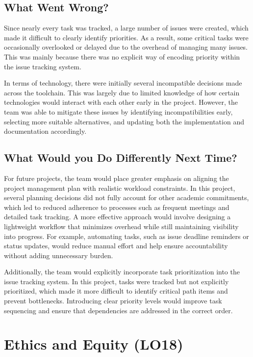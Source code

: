 \documentclass{article}
\begin{document}
\subsection{What Went Wrong?}

Since nearly every task was tracked, a large number of issues were created,
which made it difficult to clearly identify priorities. As a result, some
critical tasks were occasionally overlooked or delayed due to the overhead of
managing many issues. This was mainly because there was no explicit way of
encoding priority within the issue tracking system.

In terms of technology, there were initially several incompatible decisions
made across the toolchain. This was largely due to limited knowledge of how
certain technologies would interact with each other early in the project.
However, the team was able to mitigate these issues by identifying
incompatibilities early, selecting more suitable alternatives, and updating
both the implementation and documentation accordingly.

\subsection{What Would you Do Differently Next Time?}

For future projects, the team would place greater emphasis on aligning the
project management plan with realistic workload constraints. In this project,
several planning decisions did not fully account for other academic commitments,
which led to reduced adherence to processes such as frequent meetings and
detailed task tracking. A more effective approach would involve designing a
lightweight workflow that minimizes overhead while still maintaining visibility
into progress. For example, automating tasks, such as issue deadline reminders
or status updates, would reduce manual effort and help ensure accountability
without adding unnecessary burden.

Additionally, the team would explicitly incorporate task prioritization into the
issue tracking system. In this project, tasks were tracked but not explicitly
prioritized, which made it more difficult to identify critical path items and
prevent bottlenecks. Introducing clear priority levels would improve task
sequencing and ensure that dependencies are addressed in the correct order.


\section{Ethics and Equity (LO18)}
\end{document}
